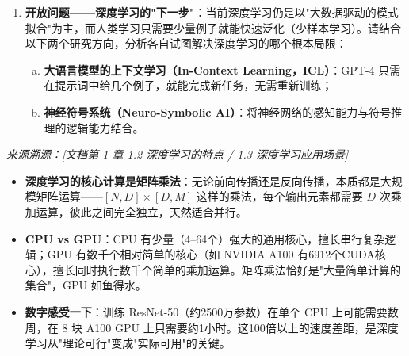 \documentclass[a4paper,11pt]{ctexart}
\begin{document}
\begin{problembox}
\begin{enumerate}[(1)]
        \item \textbf{开放问题——深度学习的"下一步"}：当前深度学习仍是以"大数据驱动的模式拟合"为主，而人类学习只需要少量例子就能快速泛化（少样本学习）。请结合以下两个研究方向，分析各自试图解决深度学习的哪个根本局限：
        \begin{enumerate}[a.]
            \item \textbf{大语言模型的上下文学习（In-Context Learning，ICL）}：GPT-4 只需在提示词中给几个例子，就能完成新任务，无需重新训练；
            \item \textbf{神经符号系统（Neuro-Symbolic AI）}：将神经网络的感知能力与符号推理的逻辑能力结合。
        \end{enumerate}
    \end{enumerate}

    \vspace{0.2cm}
    {\color{gray}\small\textit{来源溯源：[文档第 1 章 1.2 深度学习的特点 / 1.3 深度学习应用场景]}}
\end{problembox}

\begin{beginnerbox}
    \begin{itemize}
        \item \textbf{深度学习的核心计算是矩阵乘法}：无论前向传播还是反向传播，本质都是大规模矩阵运算——$[N,D]\times[D,M]$ 这样的乘法，每个输出元素都需要 $D$ 次乘加运算，彼此之间完全独立，天然适合并行。
        \item \textbf{CPU vs GPU}：CPU 有少量（4--64个）强大的通用核心，擅长串行复杂逻辑；GPU 有数千个相对简单的核心（如 NVIDIA A100 有6912个CUDA核心），擅长同时执行数千个简单的乘加运算。矩阵乘法恰好是"大量简单计算的集合"，GPU 如鱼得水。
        \item \textbf{数字感受一下}：训练 ResNet-50（约2500万参数）在单个 CPU 上可能需要数周，在 8 块 A100 GPU 上只需要约1小时。这100倍以上的速度差距，是深度学习从"理论可行"变成"实际可用"的关键。
    \end{itemize}
\end{beginnerbox}
\end{document}
